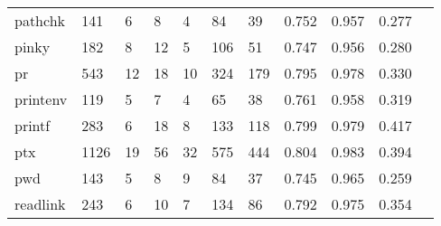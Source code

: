 \begin{longtable}{lp{1.10cm}p{1.10cm}p{1.10cm}p{1.10cm}p{1.10cm}p{1.10cm}p{1.10cm}p{1.10cm}p{1.10cm}p{1.10cm}}
pathchk   &                    141 &                                  6 &                                 8 &                                4 &                                84 &                              39 &                             0.752 &                                 0.957 &                               0.277 \\
pinky     &                    182 &                                  8 &                                12 &                                5 &                               106 &                              51 &                             0.747 &                                 0.956 &                               0.280 \\
pr        &                    543 &                                 12 &                                18 &                               10 &                               324 &                             179 &                             0.795 &                                 0.978 &                               0.330 \\
printenv  &                    119 &                                  5 &                                 7 &                                4 &                                65 &                              38 &                             0.761 &                                 0.958 &                               0.319 \\
printf    &                    283 &                                  6 &                                18 &                                8 &                               133 &                             118 &                             0.799 &                                 0.979 &                               0.417 \\
ptx       &                   1126 &                                 19 &                                56 &                               32 &                               575 &                             444 &                             0.804 &                                 0.983 &                               0.394 \\
pwd       &                    143 &                                  5 &                                 8 &                                9 &                                84 &                              37 &                             0.745 &                                 0.965 &                               0.259 \\
readlink  &                    243 &                                  6 &                                10 &                                7 &                               134 &                              86 &                             0.792 &                                 0.975 &                               0.354 \\

\end{longtable}
